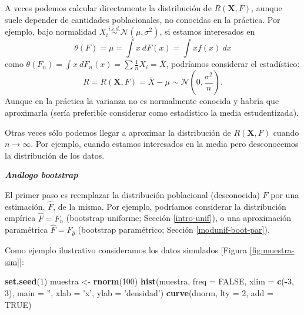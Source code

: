 \documentclass[
]{book}
\newenvironment{Shaded}{\begin{snugshade}}{\end{snugshade}}
\newcommand{\DataTypeTok}[1]{\textcolor[rgb]{0.13,0.29,0.53}{#1}}
\newcommand{\DecValTok}[1]{\textcolor[rgb]{0.00,0.00,0.81}{#1}}
\newcommand{\KeywordTok}[1]{\textcolor[rgb]{0.13,0.29,0.53}{\textbf{#1}}}
\newcommand{\NormalTok}[1]{#1}
\newcommand{\OperatorTok}[1]{\textcolor[rgb]{0.81,0.36,0.00}{\textbf{#1}}}
\newcommand{\OtherTok}[1]{\textcolor[rgb]{0.56,0.35,0.01}{#1}}
\newcommand{\StringTok}[1]{\textcolor[rgb]{0.31,0.60,0.02}{#1}}
\theoremstyle{break}
\theoremstyle{definition}
\theoremstyle{definition}
\theoremstyle{definition}
\theoremstyle{remark}
\begin{document}
A veces podemos calcular directamente la distribución de \(R\left( \mathbf{X},F \right)\),
aunque suele depender de cantidades poblacionales,
no conocidas en la práctica.
Por ejemplo, bajo normalidad \(X_i \overset{i.i.d.}{\sim} \mathcal{N}\left( \mu ,\sigma^2 \right)\), si estamos interesados en
\[\theta \left( F \right) =\mu =\int x~dF\left( x \right) =\int xf\left( x \right) ~dx\]
como \(\theta \left( F_n \right) = \int x~dF_n\left( x \right) = \sum \frac{1}{n}X_i = \bar{X}\), podríamos considerar el estadístico:
\[R=R\left( \mathbf{X},F \right) = \bar{X} - \mu \sim \mathcal{N}\left( 0 ,\frac{\sigma^2}{n} \right).\]
Aunque en la práctica la varianza no es normalmente conocida y habría que aproximarla
(sería preferible considerar como estadístico la media estudentizada).

Otras veces sólo podemos llegar a aproximar la distribución de
\(R\left( \mathbf{X},F \right)\) cuando \(n \rightarrow \infty\).
Por ejemplo, cuando estamos interesados en la media pero desconocemos la
distribución de los datos.

\textbf{\emph{Análogo bootstrap}}

El primer paso es reemplazar la distribución poblacional (desconocida) \(F\) por una
estimación, \(\hat{F}\), de la misma. Por ejemplo, podríamos considerar la
distribución empírica \(\hat{F}=F_n\) (bootstrap uniforme; Sección \ref{intro-unif}),
o una aproximación paramétrica \(\hat{F}=F_{\hat \theta}\) (bootstrap paramétrico; Sección \ref{modunif-boot-par}).

Como ejemplo ilustrativo consideramos los datos simulados {[}Figura \ref{fig:muestra-sim}{]}:

\begin{Shaded}
\begin{Highlighting}[]
\KeywordTok{set.seed}\NormalTok{(}\DecValTok{1}\NormalTok{)}
\NormalTok{muestra <-}\StringTok{ }\KeywordTok{rnorm}\NormalTok{(}\DecValTok{100}\NormalTok{)}
\KeywordTok{hist}\NormalTok{(muestra, }\DataTypeTok{freq =} \OtherTok{FALSE}\NormalTok{, }\DataTypeTok{xlim =} \KeywordTok{c}\NormalTok{(}\OperatorTok{-}\DecValTok{3}\NormalTok{, }\DecValTok{3}\NormalTok{),}
     \DataTypeTok{main =} \StringTok{''}\NormalTok{, }\DataTypeTok{xlab =} \StringTok{'x'}\NormalTok{, }\DataTypeTok{ylab =} \StringTok{'densidad'}\NormalTok{)}
\KeywordTok{curve}\NormalTok{(dnorm, }\DataTypeTok{lty =} \DecValTok{2}\NormalTok{, }\DataTypeTok{add =} \OtherTok{TRUE}\NormalTok{)}
\end{Highlighting}
\end{Shaded}
\end{document}

